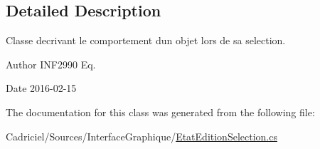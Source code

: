 \subsection{Detailed Description}
Classe decrivant le comportement d\textquotesingle{}un objet lors de sa selection. 

\begin{DoxyAuthor}{Author}
I\+N\+F2990 Eq. 
\end{DoxyAuthor}
\begin{DoxyDate}{Date}
2016-\/02-\/15 
\end{DoxyDate}


The documentation for this class was generated from the following file\+:\begin{DoxyCompactItemize}
\item 
Cadriciel/\+Sources/\+Interface\+Graphique/\hyperlink{_etat_edition_selection_8cs}{Etat\+Edition\+Selection.\+cs}\end{DoxyCompactItemize}
